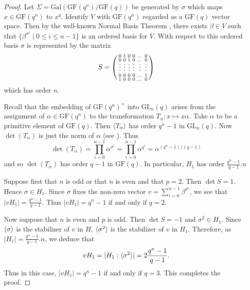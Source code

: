 \documentclass[12pt]{amsart}
\theoremstyle{remark}
\theoremstyle{notation}
\theoremstyle{definition}
\newcommand{\GF}{\mathrm{GF}}
\newcommand{\GL}{\mathrm{GL}}
\newcommand{\0}{\emptyset}
\DeclarePairedDelimiter{\gen}{\langle}{\rangle}
\begin{document}
\begin{proof} Let $\Sigma=\mathrm{Gal}(\GF(q^n)/\GF(q))$ be generated by $\sigma$ which maps $x\in \GF(q^n)$ to $x^q$.
Identify $V$ with $\GF(q^n)$ regarded as a $\GF(q)$ vector space.  Then by the well-known Normal Basis Theorem \cite[Lemma 2]{JacobsonIII}, there exists $\beta \in V$ such that $\{\beta^{\sigma^{i}}\mid 0\le i\le n-1\}$ is an ordered basis for $V$.  With respect to this ordered basis $\sigma$ is represented by the matrix $$S=\left(\begin{smallmatrix}
0&1&0&0&\dots&0\\
\vspace{-1mm}
0&0&1&0&\dots&0\\
\vspace{1mm}
\vdots&\vdots&\vdots&\vdots&\vdots&\vdots\\
0&0&0&0&\dots&1\\
1&0&0&0&\dots&0\end{smallmatrix}\right)$$
which has order $n$.


Recall that the embedding of $\GF(q^n)^\times$ into $\GL_n(q)$ arises from the assignment of $\alpha\in \GF(q^n)$ to the transformation $T_\alpha: x\mapsto x\alpha$.  Take $\alpha$ to be a primitive element of $\GF(q)$. Then $\gen{T_\alpha}$ has order $q^n-1$ in $\GL_n(q)$. Now $\det (T_\alpha)$ is just the norm of $\alpha$ (see \cite[Proposition VI.5.6]{Lang}).  Thus
 $$\det (T_\alpha)= \prod_{i=0}^{n-1} \alpha^{\sigma^i}= \prod_{i=0}^{n-1} \alpha^{q^i}= \alpha ^{(q^n-1)/(q-1)}$$ and so $\det(T_\alpha)$ has order $q-1$ in $\GF(q)$.
In particular, $H_1$ has order $\frac{q^n-1}{q-1}.n$





 Suppose first that $n$ is odd or that $n$ is even and that $p=2$. Then  $\det S=1$.  Hence  $\sigma \in H_1$. Since $\sigma$ fixes the non-zero vector $v=\sum_{i=0}^{n-1}\beta^{\sigma^{i}}$, we see that $|vH_1|= \frac{q^n-1}{q-1}$. Thus $|vH_1|=q^n-1$ if and only if $q=2$.

Now suppose that $n$ is even and $p$ is odd.  Then $\det S=-1$ and $\sigma^2 \in H_1$. Since $\gen{\sigma}$ is the stabilizer of $v$ in $H$, $\gen{\sigma^2}$ is the stabilizer of $v$ in $H_1$. Therefore, as $|H_1|= \frac{q^n-1}{q-1}.n$, we deduce that
  $$vH_1=|H_1:\gen{\sigma^2}|=  2\frac{q^n-1}{q-1}.$$ Thus in this case,  $|vH_1|=q^n-1$  if and only if  $q=3$. This completes the proof.
\end{proof}

 
\end{document}
